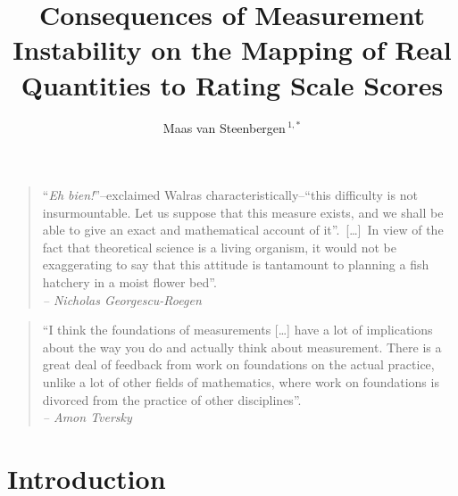 \documentclass[utf8]{FrontiersinVancouver}
\def\firstAuthorLast{van Steenbergen} %
\def\Authors{Maas van Steenbergen\,$^{1,*}$}
\begin{document}
\onecolumn
{}

\title[]{Consequences of Measurement Instability on the Mapping of Real Quantities to Rating Scale Scores} 

\author[\firstAuthorLast]{\Authors} %
\address{} %
\correspondance{} %

\extraAuth{}%

\maketitle


\begin{quote}
    ``\textit{Eh bien!}''--exclaimed Walras characteristically--``this difficulty is not insurmountable. Let us suppose that this measure exists, and we shall be able to give an exact and mathematical account of it''.\ 
    [\dots]\ In view of the fact that theoretical science is a living organism, it would not be exaggerating to say that this attitude is tantamount to planning a fish hatchery in a moist flower bed''.\\
    \textit{-- Nicholas Georgescu-Roegen}

\end{quote}
\begin{quote}
    ``I think the foundations of measurements [\ldots] have a lot of implications about the way you do and actually think about measurement. There is a great deal of feedback from work on foundations on the actual practice, unlike a lot of other fields of mathematics, where work on foundations is divorced from the practice of other disciplines''.\\
    \textit{-- Amon Tversky}
\end{quote}

\section{Introduction}
\end{document}
